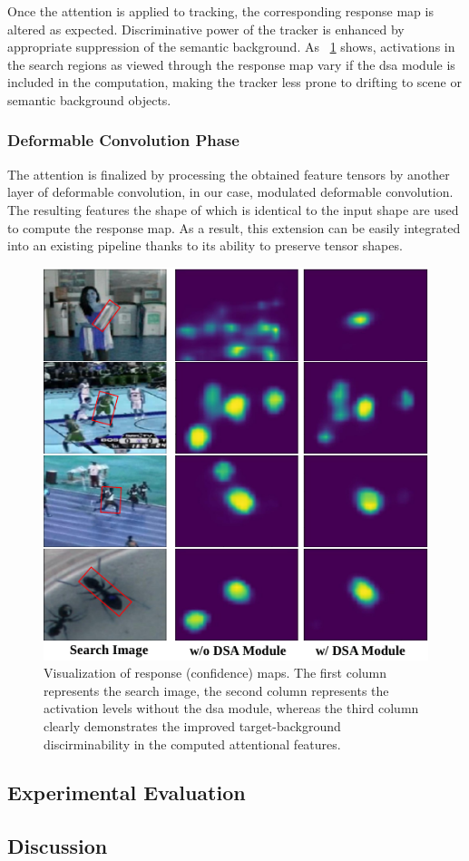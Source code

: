 Once the attention is applied to tracking, the corresponding response map is altered as expected. Discriminative power of the tracker is enhanced by appropriate suppression of the semantic background. As \figtext{}~\ref{fig:DSAAttentionVisualization} shows, activations in the search regions as viewed through the response map vary if the \gls{dsa} module is included in the computation, making the tracker less prone to drifting to scene or semantic background objects.

\subsubsection{Deformable Convolution Phase}

The attention is finalized by processing the obtained feature tensors by another layer of deformable convolution, in our case, modulated deformable convolution. The resulting features the shape of which is identical to the input shape are used to compute the response map. As a result, this extension can be easily integrated into an existing pipeline thanks to its ability to preserve tensor shapes.

\begin{figure}[t]
    \centerline{\includegraphics[width=0.5\linewidth]{figures/siamese_tracking/dsa_attention_visualization.pdf}}
    \caption[\Gls{dsa} attention visualization]{Visualization of response (confidence) maps. The first column represents the search image, the second column represents the activation levels without the \gls{dsa} module, whereas the third column clearly demonstrates the improved target-background discirminability in the computed attentional features. }
    \label{fig:DSAAttentionVisualization}
\end{figure}

\subsection{Experimental Evaluation}
\label{ssec:DSAExperimentalEvaluation}

\subsection{Discussion}
\label{ssec:DSADiscussion}
